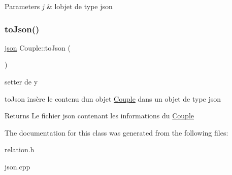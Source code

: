 \begin{DoxyParams}{Parameters}
{\em j} & l\textquotesingle{}objet de type json \\
\hline
\end{DoxyParams}
\mbox{\label{classCouple_a3173f8ef915e051870cbe81e4b1483ae}} 
\subsubsection{\texorpdfstring{to\+Json()}{toJson()}}
{\footnotesize\ttfamily \hyperlink{classnlohmann_1_1basic__json}{json} Couple\+::to\+Json (\begin{DoxyParamCaption}{ }\end{DoxyParamCaption})}



setter de y 

to\+Json insère le contenu d\textquotesingle{}un objet \hyperlink{classCouple}{Couple} dans un objet de type json \begin{DoxyReturn}{Returns}
Le fichier json contenant les informations du \hyperlink{classCouple}{Couple} 
\end{DoxyReturn}


The documentation for this class was generated from the following files\+:\begin{DoxyCompactItemize}
\item 
relation.\+h\item 
json.\+cpp\end{DoxyCompactItemize}

